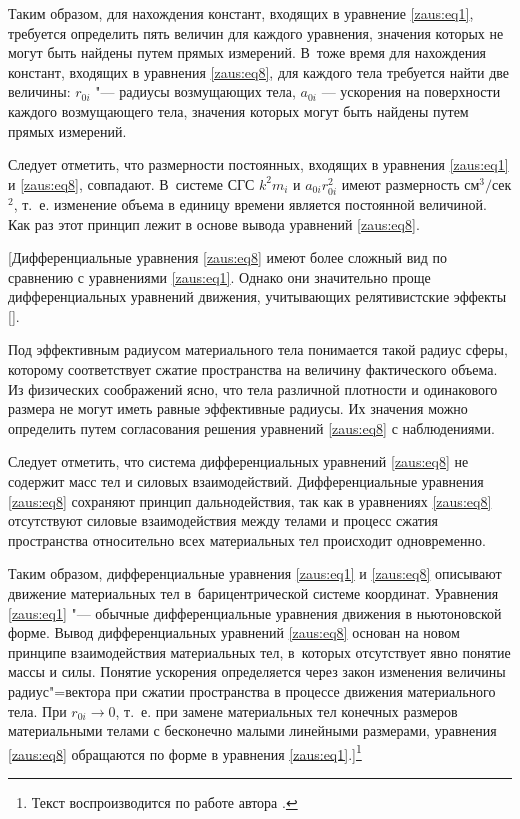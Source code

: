 Таким образом, для нахождения констант, входящих в уравнение \eqref{zaus:eq1}, требуется определить пять величин для каждого уравнения, значения которых не могут быть найдены путем прямых измерений. 
В~тоже время для нахождения констант, входящих в уравнения \eqref{zaus:eq8}, для каждого тела требуется найти две величины: $r_{0i}$ "--- радиусы возмущающих тела, $a_{0i}$ --- ускорения на поверхности каждого возмущающего тела, значения которых могут быть найдены  путем прямых измерений.

Следует отметить, что размерности постоянных, входящих в уравнения \eqref{zaus:eq1} и \eqref{zaus:eq8}, совпадают. 
В~системе СГС $k^2 m_i$ и $a_{0i} r^2_{0i}$ имеют размерность  см$^3/$сек$^2$, 
т.~е. изменение объема в единицу времени является постоянной величиной. 
Как раз этот принцип лежит в основе  вывода уравнений \eqref{zaus:eq8}.


[Дифференциальные уравнения \eqref{zaus:eq8} имеют более сложный вид по сравнению с уравнениями \eqref{zaus:eq1}. 
Однако они значительно проще дифференциальных уравнений движения, учитывающих релятивистские эффекты [].
		
Под эффективным радиусом материального тела понимается такой радиус сферы, которому соответствует сжатие пространства на величину фактического объема. Из физических соображений ясно, что тела различной плотности и одинакового размера не могут иметь равные эффективные радиусы. 
Их значения можно определить путем согласования решения уравнений \eqref{zaus:eq8} с наблюдениями.

Следует отметить, что система дифференциальных уравнений \eqref{zaus:eq8} не содержит масс  тел и силовых взаимодействий.
Дифференциальные уравнения \eqref{zaus:eq8} сохраняют принцип дальнодействия, так как в уравнениях \eqref{zaus:eq8} отсутствуют силовые взаимодействия между телами и процесс сжатия пространства относительно всех материальных тел происходит одновременно.

Таким образом, дифференциальные уравнения  \eqref{zaus:eq1} и \eqref{zaus:eq8} описывают движение материальных тел в~барицентрической системе координат. 
Уравнения  \eqref{zaus:eq1} "---  обычные дифференциальные уравнения движения в ньютоновской форме. 
Вывод дифференциальных уравнений  \eqref{zaus:eq8} основан на новом принципе взаимодействия материальных тел, в~которых отсутствует явно понятие массы и силы. 
Понятие ускорения определяется через закон изменения величины радиус"=вектора при сжатии пространства в процессе движения материального тела. 
При $r_{0i}\rightarrow0$, т.~е. при замене материальных тел конечных размеров материальными телами с бесконечно малыми линейными размерами, уравнения    \eqref{zaus:eq8} обращаются по форме в уравнения \eqref{zaus:eq1}.]\footnote{Текст воспроизводится  по работе автора \cite{zaus:11}.}

